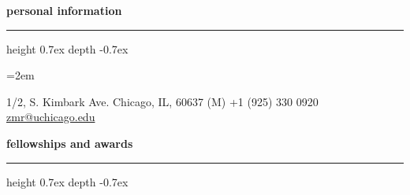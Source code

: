 \documentclass[12pt]{scrartcl}
\newcommand{\Description}[1]{\hangindent=2em\hangafter=0\noindent\raggedright\footnotesize{#1}\par\normalsize\vspace{0.5em}} %
\def\vhrulefill{\leavevmode\leaders\hrule height 0.7ex depth \dimexpr0.4pt-0.7ex\hfill\kern0pt}
\begin{document}
\begin{cv}{}
\begin{minipage}[t]{.35\textwidth}
\noindent\textbf{personal information} \hspace{1ex} \vhrulefill \vspace{0.5em}  %


{\footnotesize\noindent
	\Description{ 1/2, S. Kimbark Ave.\newline
	Chicago, IL, 60637\newline
	(M) +1 (925) 330 0920\newline
	\href{mailto:zmr@uchicago.edu}{zmr@uchicago.edu} %
	}
}


\vspace{0.5em}

\end{minipage}

\vspace{0.5em}



\noindent\textbf{fellowships and awards} \hspace{1ex} \vhrulefill \vspace{0.5em}


\end{cv}
\end{document}
